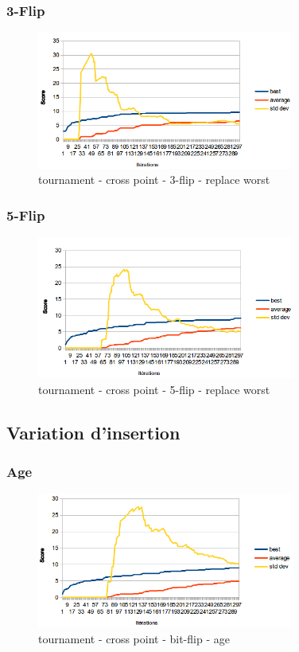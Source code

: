\documentclass[a4paper,10pt]{report}
\begin{document}
\subsubsection{3-Flip}
\begin{figure}[h]
  \begin{center}
    \includegraphics[width=320px]{images/graph-3-flip.png}
  \end{center}
  \caption{tournament - cross point - 3-flip - replace worst}
\end{figure}

\subsubsection{5-Flip}
\begin{figure}[h]
  \begin{center}
    \includegraphics[width=320px]{images/graph-5-flip.png}
  \end{center}
  \caption{tournament - cross point - 5-flip - replace worst}
\end{figure}


\pagebreak
\subsection{Variation d'insertion}
\subsubsection{Age}
\begin{figure}[h]
  \begin{center}
    \includegraphics[width=320px]{images/graph-age.png}
  \end{center}
  \caption{tournament - cross point - bit-flip - age}
\end{figure}
\end{document}
